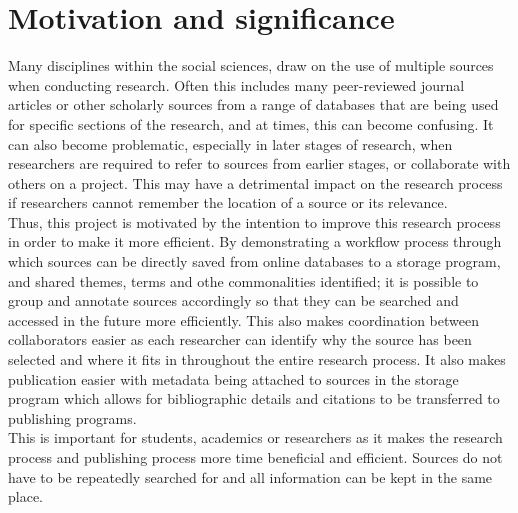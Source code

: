 \documentclass[preprint,12pt, a4paper]{elsarticle}
\begin{document}
\linenumbers







\section{Motivation and significance}
\label{}


Many disciplines within the social sciences, draw on the use of multiple sources when conducting research. Often this includes many peer-reviewed journal articles or other scholarly sources from a range of databases that are being used for specific sections of the research, and at times, this can become confusing. It can also become problematic, especially in later stages of research, when researchers are required to refer to sources from earlier stages, or collaborate with others on a project. This may have a detrimental impact on the research process if researchers cannot remember the location of a source or its relevance.\\
Thus, this project is motivated by the intention to improve this research process in order to make it more efficient. By demonstrating a workflow process through which sources can be directly saved from online databases to a storage program, and shared themes, terms and othe commonalities identified; it is possible to group and annotate sources accordingly so that they can be searched and accessed in the future more efficiently. This also makes coordination between collaborators easier as each researcher can identify why the source has been selected and where it fits in throughout the entire research process. It also makes publication easier with metadata being attached to sources in the storage program which allows for bibliographic details and citations to be transferred to publishing programs. \\
This is important for students, academics or researchers as it makes the research process and publishing process more time beneficial and efficient. Sources do not have to be repeatedly searched for and all information can be kept in the same place.
\end{document}

